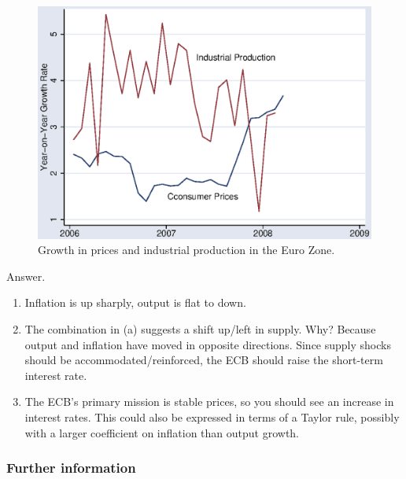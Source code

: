 \documentclass[letterpaper,12pt]{article}
\begin{document}
\begin{enumerate}
\begin{figure}[h]
    \centering
    \includegraphics[scale=0.8]{final_08.eps}
    \caption{Growth in prices and industrial production in the 
    Euro Zone.} 
    \label{fig:ez}
\end{figure}


Answer.
\begin{enumerate}
\item Inflation is up sharply, output is flat to down. 

\item The combination in (a) suggests a shift up/left in supply.
Why?  Because output and inflation have moved in opposite directions.
Since supply shocks should be accommodated/reinforced, 
the ECB should raise the short-term interest rate.

\item The ECB's primary mission is stable prices, 
so you should see an increase in interest rates.
This could also be expressed in terms of a Taylor rule, 
possibly with a larger coefficient on inflation 
than output growth.  

\end{enumerate}



\end{enumerate}


\subsubsection*{Further information}
\end{document}
